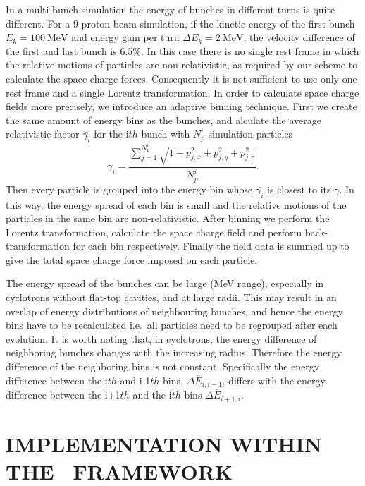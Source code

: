 \documentclass[aps,prstab,twocolumn,superscriptaddress,showpacs]{revtex4}
\begin{document}
In a multi-bunch simulation the energy of bunches in different turns is quite different. 
For a 9 proton beam simulation, if the kinetic energy of the first bunch $E_k=100~\text{MeV}$ and energy gain per turn $\Delta E_k=2~\text{MeV}$, 
the velocity difference of the first and last bunch is $6.5\%$.  
In this case there is no single rest frame in which the relative motions of 
particles are non-relativistic, as required by our scheme to calculate the space charge forces. Consequently it is not sufficient to use only one rest frame 
and a single Lorentz transformation. In order to calculate space charge fields more precisely, we introduce an adaptive binning technique.
First we create the same amount of energy bins as the bunches, and alculate the average relativistic factor $\bar{\gamma_i}$ for the i$th$ bunch with $N_p^i$ simulation particles
\begin{equation}\label{eq:dR1}
  \bar{\gamma}_i = \frac{\sum_{j=1}^{N_p^i}\sqrt{1+p_{j,x}^2+p_{j,y}^2+p_{j,z}^2}}{N_p^i}.
\end{equation}
Then every particle is grouped into the energy bin whose $\bar{\gamma_i}$ is closest to its $\gamma$. In this way, the energy spread of each bin is small and the relative motions of the particles in the same bin are non-relativistic.
After binning we perform the Lorentz transformation, calculate the space charge field and perform back-transformation for each bin respectively. 
Finally the field data is summed up to give  the total space charge force imposed on each particle.

The energy spread of the bunches can be large (MeV range), especially in cyclotrons without flat-top cavities, and at large radii. This may result in an overlap of 
energy distributions of neighbouring bunches, and hence the energy bins have to be recalculated i.e.\ all particles need to be regrouped after each evolution.
It is worth noting that, in cyclotrons, the energy difference of neighboring bunches changes  with the increasing radius.
Therefore the energy difference of the neighboring bins is not constant. Specifically the energy difference between the i$th$ and i-1$th$ bins, $\Delta\bar{E}_{i,i-1}$, 
differs with the energy difference between the i+1$th$ and the i$th$ bins $\Delta\bar{E}_{i+1,i}$.

\section{IMPLEMENTATION WITHIN THE \opal \  FRAMEWORK}
\end{document}

